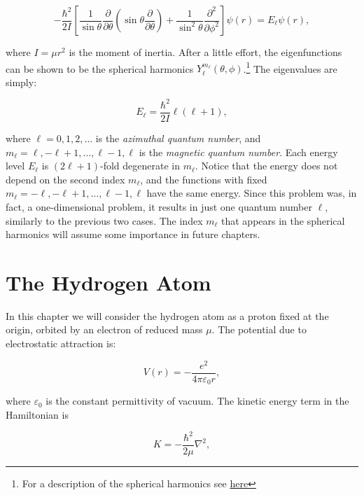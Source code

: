 \documentclass[
  9pt,
]{extbook}
\theoremstyle{definition}
\theoremstyle{definition}
\theoremstyle{definition}
\theoremstyle{remark}
\begin{document}
\begin{equation}
- \frac{\hbar^2}{2I} \left[ \frac{1}{\sin \theta}
\frac{\partial}{\partial \theta} \left(\sin\theta\frac{\partial}{\partial \theta} \right) + \frac{1}{\sin^2 \theta} \frac{\partial^2}{\partial \phi^2} \right] \psi(r) = E_{\ell} \psi(r),
\label{eq:RR1}
\end{equation}

where \(I=\mu r^2\) is the moment of inertia. After a little effort, the eigenfunctions can be shown to be the spherical harmonics \(Y_{\ell}^{m_{\ell}}(\theta, \phi)\).\footnote{For a description of the spherical harmonics see \href{https://en.wikipedia.org/wiki/Spherical_harmonic}{here}} The eigenvalues are simply:

\begin{equation}
E_{\ell} = \frac{\hbar^2}{2I} \ell(\ell+1),
\label{eq:RR2}
\end{equation}

where \(\ell=0,1,2,\ldots\) is the \emph{azimuthal quantum number}, and \(m_{\ell}=\ell, -\ell+1, \ldots, \ell-1, \ell\) is the \emph{magnetic quantum number}. Each energy level \(E_{\ell}\) is \((2\ell+1)\)-fold degenerate in \(m_{\ell}\). Notice that the energy does not depend on the second index \(m_{\ell}\), and the functions with fixed \(m_{\ell}=-\ell,-\ell+1,\dots,\ell-1,\ell\) have the same energy. Since this problem was, in fact, a one-dimensional problem, it results in just one quantum number \(\ell\), similarly to the previous two cases. The index \(m_{\ell}\) that appears in the spherical harmonics will assume some importance in future chapters.

\hypertarget{Hydrogen}{%
\chapter{The Hydrogen Atom}\label{Hydrogen}}

In this chapter we will consider the hydrogen atom as a proton fixed at the origin, orbited by an electron of reduced mass \(\mu\). The potential due to electrostatic attraction is:

\begin{equation}
V(r) = - \frac{e^2}{4 \pi \varepsilon_0 r},
\label{eq:HA1}
\end{equation}

where \(\varepsilon_0\) is the constant permittivity of vacuum.
The kinetic energy term in the Hamiltonian is

\begin{equation}
K = - \frac{\hbar^2}{2 \mu} \nabla^2,
\label{eq:HA2}
\end{equation}
\end{document}
